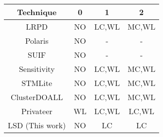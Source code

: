 \centering 
\begin{tabular}{c|c|c|c}
\hline 
Technique & 0 & 1  & 2 \\ \hline
LRPD \cite{rauchwerger:95:sigplan,dang:02:ipdps} & NO  & LC,WL & MC,WL \\ \hline
Polaris \cite{tu:94:lcpc,blume:96:icpp} & NO & - & -  \\ \hline
SUIF \cite{suif:94:stanford,hall:05:toplas} & NO  & - & - \\ \hline
Sensitivity \cite{Rus:07:ics} & NO  & LC,WL & MC,WL \\ \hline
STMLite \cite{mehrara:09:stmlite} & NO  & LC,WL  & MC,WL \\ \hline
ClusterDOALL \cite{kim:12:cgo} & NO & LC,WL  & MC,WL \\ \hline
Privateer \cite{johnson:12:pldi} & WL  & LC,WL  & LC,WL  \\ \hline
LSD (This work) & NO  & LC & LC \\ \hline
\end{tabular}
